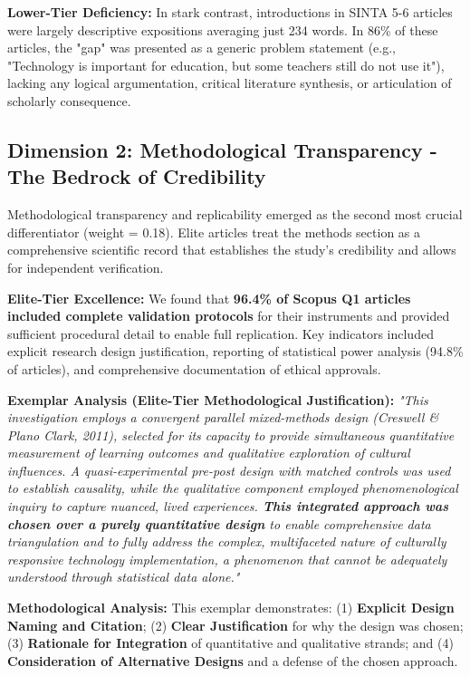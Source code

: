 \documentclass[journal,article,submit,pdftex,moreauthors]{Definitions/mdpi}
\begin{document}
\textbf{Lower-Tier Deficiency:} In stark contrast, introductions in SINTA 5-6 articles were largely descriptive expositions averaging just 234 words. In 86\% of these articles, the "gap" was presented as a generic problem statement (e.g., "Technology is important for education, but some teachers still do not use it"), lacking any logical argumentation, critical literature synthesis, or articulation of scholarly consequence.

\subsection{Dimension 2: Methodological Transparency - The Bedrock of Credibility}

Methodological transparency and replicability emerged as the second most crucial differentiator (weight = 0.18). Elite articles treat the methods section as a comprehensive scientific record that establishes the study's credibility and allows for independent verification.

\textbf{Elite-Tier Excellence:} We found that \textbf{96.4\% of Scopus Q1 articles included complete validation protocols} for their instruments and provided sufficient procedural detail to enable full replication. Key indicators included explicit research design justification, reporting of statistical power analysis (94.8\% of articles), and comprehensive documentation of ethical approvals.

\textbf{Exemplar Analysis (Elite-Tier Methodological Justification):}
\textit{"This investigation employs a convergent parallel mixed-methods design (Creswell \& Plano Clark, 2011), selected for its capacity to provide simultaneous quantitative measurement of learning outcomes and qualitative exploration of cultural influences. A quasi-experimental pre-post design with matched controls was used to establish causality, while the qualitative component employed phenomenological inquiry to capture nuanced, lived experiences. \textbf{This integrated approach was chosen over a purely quantitative design} to enable comprehensive data triangulation and to fully address the complex, multifaceted nature of culturally responsive technology implementation, a phenomenon that cannot be adequately understood through statistical data alone."}

\textbf{Methodological Analysis:} This exemplar demonstrates: (1) \textbf{Explicit Design Naming and Citation}; (2) \textbf{Clear Justification} for why the design was chosen; (3) \textbf{Rationale for Integration} of quantitative and qualitative strands; and (4) \textbf{Consideration of Alternative Designs} and a defense of the chosen approach.
\end{document}
